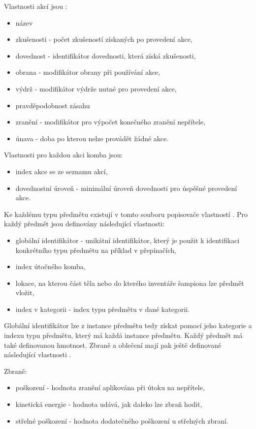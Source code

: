 Vlastnosti akcí jsou :
\begin{itemize}
\item název 
\item zkušenosti - počet zkušeností získaných po provedení akce,
\item dovednost - identifikátor dovednosti, která získá zkušenosti,
\item obrana - modifikátor obrany při používání akce,
\item výdrž - modifikátor výdrže nutné pro provedení akce, 
\item pravděpodobnost zásahu 
\item zranění - modifikátor pro výpočet konečného zranění nepřítele, 
\item únava - doba po kterou nelze provádět žádné akce. 
\end{itemize}

Vlastnosti pro každou akci komba jsou:
\begin{itemize}
\item index akce se ze seznamu akcí, 
\item dovednostní úroveň - minimální úroveň dovednosti pro úspěšné provedení akce. 
\end{itemize}

Ke každému typu předmětu existují v tomto souboru popisovače vlastností .
Pro každý předmět jsou definovány následující vlastnosti:  
\begin{itemize}
\item globální identifikátor - unikátní identifikátor, který je použit k identifikaci konkrétního typu předmětu na příklad v přepínačích,
\item index útočného komba,
\item lokace, na kterou část těla nebo do kterého inventáře šampiona lze předmět vložit,
\item index v kategorii - index typu předmětu v dané kategorii.
\end{itemize}
Globální identifikátor lze z instance předmětu tedy získat pomocí jeho kategorie a indexu typu předmětu,
který má každá instance předmětu. Každý předmět má také definovanou hmotnost. Zbraně a oblečení mají
pak ještě definované následující vlastnosti .

Zbraně:
\begin{itemize}
\item poškození - hodnota zranění aplikována při útoku na nepřítele,
\item kinetická energie - hodnota udává, jak daleko lze zbraň hodit,
\item střelné poškození - hodnota dodatečného poškození u střelných zbraní.
\end{itemize}

